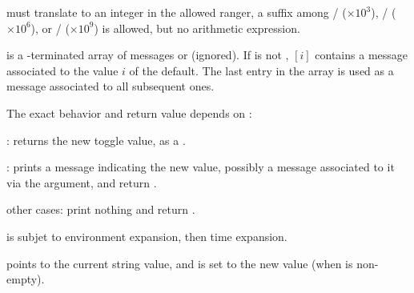 \item {} must translate to an integer in the allowed ranger, a suffix
among
/ ($\times 10^3$),
/ ($\times 10^6$),
or
/ ($\times 10^9$) is allowed, but no arithmetic expression.

\item {} is a \kbd[NULL]-terminated array of messages or 
(ignored). If  is not , $[i]$ contains
a message associated to the value $i$ of the default. The last entry in the
 array is used as a message associated to all subsequent ones.

The exact behavior and return value depends on :

\item {}: returns the new toggle value, as a .

\item {}: prints a message indicating the new value,
possibly a message associated to it via the  argument, and return
.

\item other cases: print nothing and return .

\item {} is subjet to environment expansion, then time expansion.

\item {} points to the current string value, and is set to the new
value (when  is non-empty).
